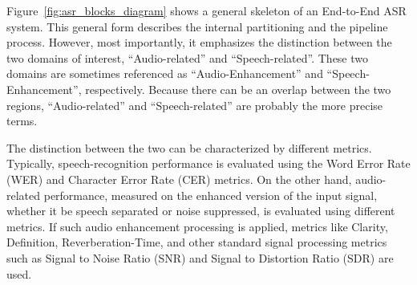 Figure~\ref{fig:asr_blocks_diagram} shows 
a general skeleton of
an End-to-End ASR system. This general form describes the
internal partitioning and the pipeline process.
However, most importantly, it emphasizes
the distinction between the two domains of interest,
``Audio-related'' and ``Speech-related''.
These two domains are sometimes referenced
as ``Audio-Enhancement'' and ``Speech-Enhancement'', respectively.
Because there can be an overlap between
the two regions, ``Audio-related'' 
and ``Speech-related'' are probably the more precise terms.



The distinction between the two can be characterized
by different metrics.
Typically, speech-recognition performance is evaluated
using the Word Error Rate (WER) and
Character Error Rate (CER) metrics.
On the other hand, audio-related performance,
measured on the enhanced version of the input signal,
whether it be speech separated or noise suppressed,
is evaluated using different metrics.
If such audio enhancement processing is applied,
metrics like Clarity, Definition,
Reverberation-Time, and other standard signal processing metrics
such as Signal to Noise Ratio (SNR) 
and Signal to Distortion Ratio (SDR) are used.






